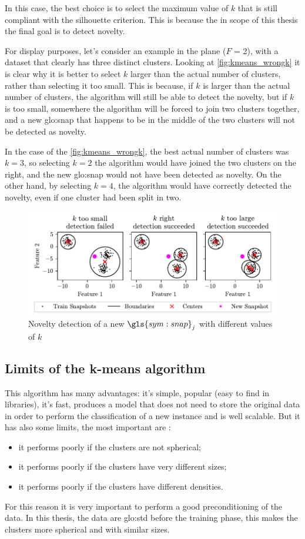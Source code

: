 In this case, the best choice is to select the maximum value of $k$ that is still compliant with the silhouette criterion. This is because the in scope of this thesis the final goal is to detect novelty. 

For display purposes, let's consider an example in the plane ($F$ = 2), with a dataset that clearly has three distinct clusters. Looking at \autoref{fig:kmeans_wrongk} it is clear why it is better to select $k$ larger than the actual number of clusters, rather than selecting it too small. This is because, if $k$ is larger than the actual number of clusters, the algorithm will still be able to detect the novelty, but if $k$ is too small, somewhere the algorithm will be forced to join two clusters together, and a new {\gls{glo:snap}} that happens to be in the middle of the two clusters will not be detected as novelty. 

In the case of the \autoref{fig:kmeans_wrongk}, the best actual number of clusters was $k=3$, so selecting $k=2$ the algorithm would have joined the two clusters on the right, and the new {\gls{glo:snap}} would not have been detected as novelty. On the other hand, by selecting $k=4$, the algorithm would have correctly detected the novelty, even if one cluster had been split in two.

\begin{figure}
  \centering
  \includegraphics[width=\textwidth]{images/Kmeans/Kmeans_wrongk.pdf}
  \caption{Novelty detection of a new $\gls{sym:snap}_j$ with different values of $k$}
  \label{fig:kmeans_wrongk}
\end{figure}


\subsection{Limits of the k-means algorithm}
\label{sec:kmeans_limits}
This algorithm has many advantages: it's simple, popular (easy to find in libraries), it's fast, produces a model that does not need to store the original data in order to perform the classification of a new instance and is well scalable. But it has also some limits, the most important are :
\begin{itemize}
  \item it performs poorly if the clusters are not spherical;
  \item it performs poorly if the clusters have very different sizes;
  \item it performs poorly if the clusters have different densities.
\end{itemize}

For this reason it is very important to perform a good preconditioning of the data. In this thesis, the data are \gls{glo:std} before the training phase, this makes the clusters more spherical and with similar sizes. 




